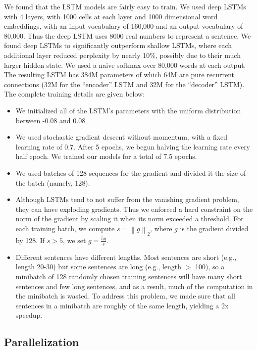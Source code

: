 \documentclass{article} \usepackage{nips14submit_e}
\begin{document}
We found that the LSTM models are fairly easy to train.  We used deep
LSTMs with 4 layers, with 1000 cells at each layer and 1000
dimensional word embeddings, with an input vocabulary of 160,000
and an output vocabulary of 80,000.  Thus the deep LSTM uses 8000 real 
numbers to represent a sentence. We found deep LSTMs to
significantly outperform shallow LSTMs, where each additional layer
reduced perplexity by nearly 10\%, possibly due to their much larger
hidden state.  We used a naive softmax over 80,000 words at each
output.  The resulting LSTM has 384M parameters of which 64M are pure
recurrent connections (32M for the ``encoder'' LSTM and 32M for the
``decoder'' LSTM). The complete training details are given below:
\begin{itemize}
\item We initialized all of the LSTM's parameters with the uniform distribution between
  -0.08 and 0.08
\item We used stochastic gradient descent without momentum,
  with a fixed learning rate of 0.7.  After 5 epochs, we begun
  halving the learning rate every half epoch.  We trained our models for a
  total of 7.5 epochs.
\item We used batches of 128 sequences for the gradient and divided it
  the size of the batch (namely, 128).
\item Although LSTMs tend to not suffer from the vanishing gradient
  problem, they can have exploding gradients.  Thus we enforced a hard
  constraint on the norm of the gradient
  \cite{graves13c,razvan} by scaling it when its norm exceeded
  a threshold. For each training batch, we compute $s =
  \left\|g\right\|_2$, where $g$ is the gradient divided by 128. If $s > 5$, we set
  $g = \frac{5g}{s}$.
\item Different sentences have different lengths.  Most sentences are
  short (e.g., length 20-30) but some sentences are long (e.g., length
  $>$ 100), so a minibatch of 128 randomly chosen training sentences
  will have many short sentences and few long sentences, and as a
  result, much of the computation in the minibatch is wasted.  To
  address this problem, we made sure that all sentences in a
  minibatch are roughly of the same length, yielding a 2x speedup.
\end{itemize}


\subsection{Parallelization}
\end{document}
